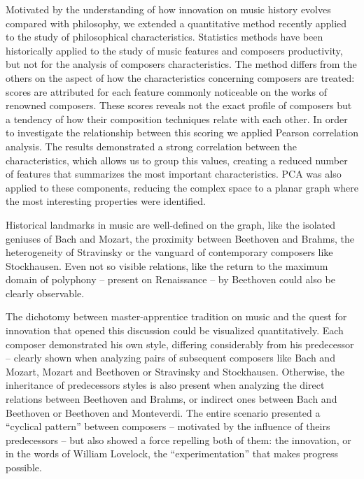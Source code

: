 \documentclass[
 aip,
 jmp,
 amsmath,amssymb,
 reprint,
]{revtex4-1}
\begin{document}
Motivated by the understanding of how innovation on music history
evolves compared with philosophy, we extended a quantitative method
recently applied to the study of philosophical characteristics. Statistics
methods have been historically applied to the study of music features and
composers productivity, but not for the analysis of
composers characteristics. The method differs from the others on the
aspect of how the characteristics concerning composers are treated:
scores are attributed for each feature commonly noticeable on the
works of renowned composers. These scores reveals not the
exact profile of composers but a tendency of how their composition
techniques relate with each other. In order to investigate the
relationship between this scoring we applied Pearson correlation
analysis. The results demonstrated a strong correlation between the
characteristics, which allows us to group this values, creating a
reduced number of features that summarizes the most important
characteristics. PCA was also applied to these components, reducing
the complex space to a planar graph where the most interesting
properties were identified. 

Historical landmarks in  music are
well-defined on the graph, like the isolated geniuses of Bach and Mozart, the
proximity between Beethoven and Brahms, the heterogeneity of
Stravinsky or the vanguard of contemporary composers
like Stockhausen. Even not so visible relations, like the return to the
maximum domain of polyphony -- present on Renaissance -- by Beethoven
could also be clearly observable. 

The dichotomy between
master-apprentice tradition on music and the quest for innovation that
opened this discussion could be visualized quantitatively. Each
composer demonstrated his own style, differing considerably from his
predecessor -- clearly shown when analyzing pairs of subsequent composers like
Bach and Mozart, Mozart and Beethoven or Stravinsky and
Stockhausen. Otherwise, the inheritance of predecessors styles is also
present when analyzing the direct relations between Beethoven and
Brahms, or indirect ones between Bach and Beethoven
or Beethoven and Monteverdi. The entire scenario presented
a ``cyclical pattern'' between
composers -- motivated by the influence of theirs predecessors -- but also showed a force
repelling both of them: the innovation, or in the words of William
Lovelock, the ``experimentation'' that makes progress possible.
\end{document}
